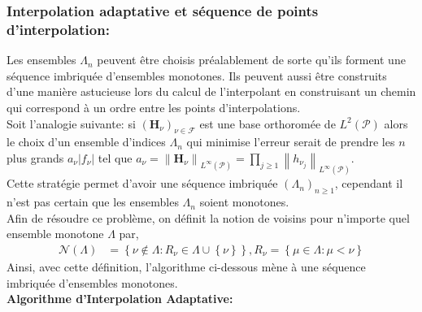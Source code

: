 \newpage
\subsubsection{Interpolation adaptative et séquence de points d'interpolation:}

\hspace{0.5cm}
Les ensembles $\Lambda_n$ peuvent être choisis préalablement de sorte qu'ils forment une
séquence imbriquée d'ensembles monotones. Ils peuvent aussi être construits d'une manière astucieuse
lors du calcul de l'interpolant en construisant un chemin qui correspond à un ordre entre les points d'interpolations. \\

Soit l'analogie suivante: si $(\textbf{H}_{\nu})_{\nu \in \mathcal{F}}$ est une base orthoromée de $L^2(\mathcal{P})$ alors
le choix d'un ensemble d'indices $\Lambda_n$ qui minimise l'erreur  serait de prendre les $n$ plus grands $a_{\nu} \left | f_{\nu}  \right |$
tel que $a_{\nu} = \left \| \textbf{H}_{\nu} \right \|_{L^{\infty}(\mathcal{P})} = \prod_{j \geq 1} \left \| {h_{\nu_j}} \right \|_{L^{\infty}(\mathcal{P})}$. \\
Cette stratégie permet d'avoir une séquence imbriquée $(\Lambda_n)_{n \geq 1}$, cependant il n'est pas certain que les
ensembles $\Lambda_n$ soient monotones. \\
Afin de résoudre ce problème, on définit la notion de voisins pour n'importe quel ensemble monotone $\Lambda$ par,
\begin{align}
	 \mathcal{N}(\Lambda) & = \left \{ \nu \notin \Lambda : R_{\nu} \in \Lambda \cup \left \{ \nu \right \} \right \}, R_{\nu} = \left \{ \mu \in \Lambda : \mu < \nu \right \}
\end{align}
Ainsi, avec cette définition, l'algorithme ci-dessous mène à une séquence imbriquée d'ensembles monotones. \\

\textbf{Algorithme d'Interpolation Adaptative:}

\vspace{0.5cm}

